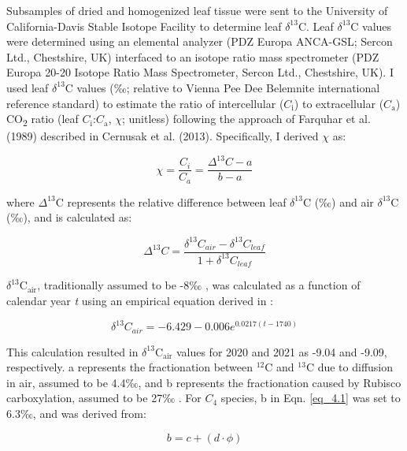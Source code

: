 Subsamples of dried and homogenized leaf tissue were sent to the University of California-Davis Stable Isotope Facility to determine leaf $\delta^{13}$C. Leaf $\delta^{13}$C values were determined using an elemental analyzer (PDZ Europa ANCA-GSL; Sercon Ltd., Chestshire, UK) interfaced to an isotope ratio mass spectrometer (PDZ Europa 20-20 Isotope Ratio Mass Spectrometer, Sercon Ltd., Chestshire, UK). I used leaf $\delta^{13}$C values (‰; relative to Vienna Pee Dee Belemnite international reference standard) to estimate the ratio of intercellular ($C_\mathrm{i}$) to extracellular ($C_\mathrm{a}$) CO\textsubscript{2} ratio (leaf $C_\mathrm{i}$:$C_\mathrm{a}$, $\chi$; unitless) following the approach of Farquhar et al. (1989) described in Cernusak et al. (2013). Specifically, I derived $\chi$ as:

\begin{equation} 
    \label{eq_4.1}
    \chi=\frac{C_{i}}{C_{a}}=\frac{\Delta^{13}C - a}{b - a}
\end{equation}
    
\noindent where $\Delta^{13}$C represents the relative difference between leaf $\delta^{13}$C (‰) and air $\delta^{13}$C (‰), and is calculated as:

\begin{equation}
    \label{eq_4.2}
    \Delta^{13}C = \frac{\delta^{13}C_{air} - \delta^{13}C_{leaf}}{1 + \delta^{13}C_{leaf}}
\end{equation}

\noindent $\delta^{13}\mathrm{C_{air}}$, traditionally assumed to be -8‰ , was calculated as a function of calendar year \textit{t} using an empirical equation derived in :

\begin{equation}
    \label{eq_4.3}
    \delta^{13}C_{air} = -6.429 - 0.006e^{0.0217(t-1740)}
\end{equation}
    
 \noindent This calculation resulted in $\delta^{13}\mathrm{C_{air}}$ values for 2020 and 2021 as -9.04 and -9.09, respectively. a represents the fractionation between $^{12}\mathrm{C}$ and $^{13}\mathrm{C}$ due to diffusion in air, assumed to be 4.4‰, and b represents the fractionation caused by Rubisco carboxylation, assumed to be 27‰ . For $C_{4}$ species, b in Eqn. \ref{eq_4.1} was set to 6.3‰, and was derived from:

\begin{equation}
    \label{eq_4.4}
    b = c + (d \cdot \phi)
\end{equation}
    
